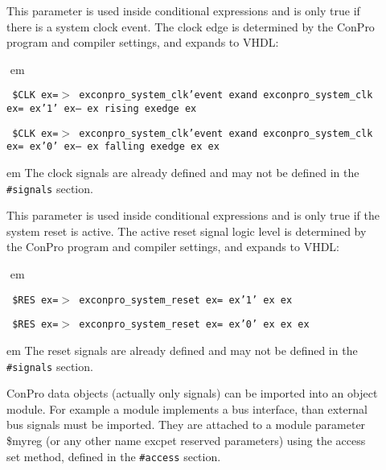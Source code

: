 \documentclass[a4paper,12pt,twoside,english]{article}
\def\s{\hskip 1.15 ex}
\begin{document}
\begin{description}
\begin{description}
\item[] $ $\\
This parameter is used inside conditional expressions and is only true if there is a system clock event. The clock edge is determined by the ConPro program and
compiler settings, and expands to VHDL:

\def\prefskipu{}\def\prefskipo{}\def\prefskipa{}\def\prefskipu{\hskip10pt}\def\prefskipo{\hskip10pt}\def\prefskipa{\hskip30pt}\def\content{
\vskip-5pt{\parindent0pt\parbox{\linewidth}{\tt\smallsize\hskip10pt \$CLK\s =$>$\s conpro\_system\_clk'event\s and\s conpro\_system\_clk\s =\s '1'\s --\s
rising\s edge\s }}
\vskip-5pt{\parindent0pt\parbox{\linewidth}{\tt\smallsize\hskip10pt \$CLK\s =$>$\s conpro\_system\_clk'event\s and\s conpro\_system\_clk\s =\s '0'\s --\s
falling\s edge\s \s }}
}
$ $
 em
\content
{} em
The clock signals are already defined and may not be defined in the  {\tt \#signals} section.


\item[] $ $\\
This parameter is used inside conditional expressions and is only true if the system reset is active. The active reset signal  logic level is determined by the
ConPro program and compiler settings, and expands to VHDL:

\def\prefskipu{}\def\prefskipo{}\def\prefskipa{}\def\prefskipu{\hskip10pt}\def\prefskipo{\hskip10pt}\def\prefskipa{\hskip30pt}\def\content{
\vskip-5pt{\parindent0pt\parbox{\linewidth}{\tt\smallsize\hskip10pt \$RES\s =$>$\s conpro\_system\_reset\s =\s '1'\s \s }}
\vskip-5pt{\parindent0pt\parbox{\linewidth}{\tt\smallsize\hskip10pt \$RES\s =$>$\s conpro\_system\_reset\s =\s '0'\s \s \s }}
}
$ $
 em
\content
{} em
The reset signals are already defined and may not be defined in the  {\tt \#signals} section.


\item[] $ $\\
ConPro data objects (actually only signals) can be imported into an object module. For example a module implements a bus interface, than external bus signals
must be imported. They are attached to a module parameter \$myreg (or any other name excpet reserved parameters) using the access set method, defined in the
{\tt  \#access} section.


\end{description}
\end{description}
\end{document}
